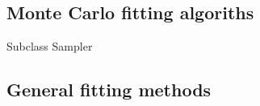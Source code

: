 \hypertarget{custom-MC}{}
\subsection*{Monte Carlo fitting algoriths} \label{custom-MC}

Subclass Sampler

\hypertarget{custom-gen-model}{}
\subsection*{General fitting methods} \label{custom-gen-model}
